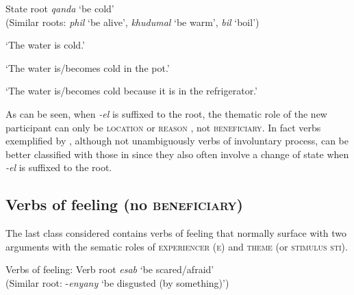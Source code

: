 \documentclass[output=paper]{langsci/langscibook}
\begin{document}
\newpage 
\ea\label{ex:sibanda:16}
\settowidth{}
{State root \textit{qanda} ‘be cold’}\\
 (Similar roots: \textit{phil} ‘be alive’, \textit{khudumal} ‘be warm’, \textit{bil} ‘boil’)\\

\glt ‘The water is cold.’


\glt ‘The water is/becomes cold in the pot.’


\glt ‘The water is/becomes cold because it is in the refrigerator.’
\z
\z

As can be seen, when \textit{-el} is suffixed to the root, the thematic role of the new participant can only be \textsc{location}  or \textsc{reason} , not \textsc{beneficiary}. In fact  verbs exemplified by , although not unambiguously verbs of involuntary process, can be better classified with those in  since they also often involve a change of state when \textit{-el} is suffixed to the root.

\subsection{Verbs of feeling (no \textsc{beneficiary)}}\label{sec:sibanda:4.6}

The last class considered contains verbs of feeling that normally surface with two arguments with the sematic roles of \textsc{experiencer} (\textsc{e}) and \textsc{theme} (or \textsc{stimulus} \textsc{sti}). 

\ea\label{ex:sibanda:17}
\settowidth{}
{Verbs of feeling: Verb root \textit{esab} ‘be scared/afraid’}\\
 (Similar root: -\textit{enyany} ‘be disgusted (by something)’)\\
\end{document}
